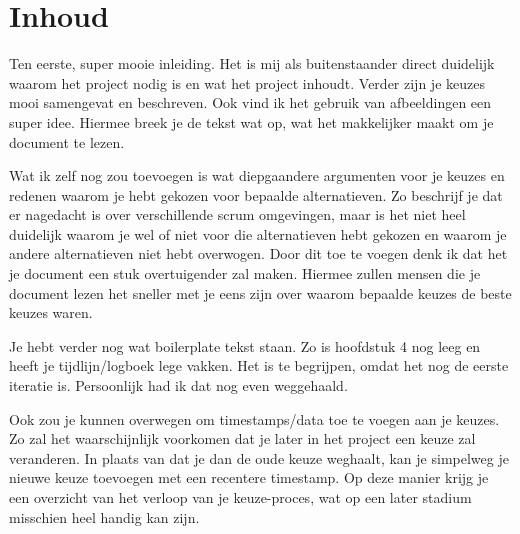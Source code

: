 \documentclass[a4paper]{report}
\begin{document}
\section{Inhoud}
Ten eerste, super mooie inleiding. Het is mij als buitenstaander direct duidelijk waarom het project nodig is en wat het project inhoudt. 
Verder zijn je keuzes mooi samengevat en beschreven. 
Ook vind ik het gebruik van afbeeldingen een super idee. Hiermee breek je de tekst wat op, wat het makkelijker maakt om je document te lezen.
\par\smallskip 
Wat ik zelf nog zou toevoegen is wat diepgaandere argumenten voor je keuzes en redenen waarom je hebt gekozen voor bepaalde alternatieven. 
Zo beschrijf je dat er nagedacht is over verschillende scrum omgevingen, maar is het niet heel duidelijk waarom je wel of niet voor die alternatieven hebt gekozen en waarom je andere alternatieven niet hebt overwogen.
Door dit toe te voegen denk ik dat het je document een stuk overtuigender zal maken. Hiermee zullen mensen die je document lezen het sneller met je eens zijn over waarom bepaalde keuzes de beste keuzes waren. 
\par\smallskip 
Je hebt verder nog wat boilerplate tekst staan. Zo is hoofdstuk 4 nog leeg en heeft je tijdlijn/logboek lege vakken. 
Het is te begrijpen, omdat het nog de eerste iteratie is. Persoonlijk had ik dat nog even weggehaald.
\par\smallskip 
Ook zou je kunnen overwegen om timestamps/data toe te voegen aan je keuzes. 
Zo zal het waarschijnlijk voorkomen dat je later in het project een keuze zal veranderen. In plaats van dat je dan de oude keuze weghaalt, kan je simpelweg je nieuwe keuze toevoegen met een recentere timestamp.
Op deze manier krijg je een overzicht van het verloop van je keuze-proces, wat op een later stadium misschien heel handig kan zijn. 
\end{document}
